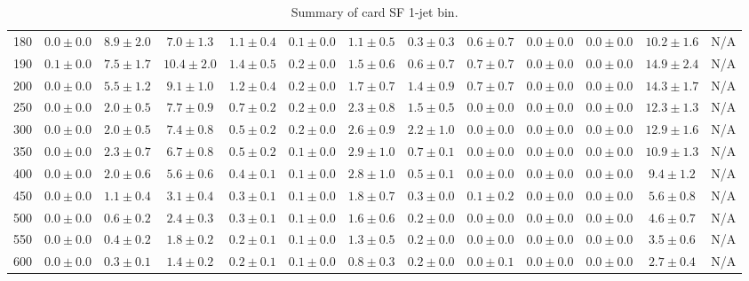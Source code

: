 \begin{table}
{\begin{center}
\begin{tabular}{l | c c | c c c c c c c c  | c c}
180 & $0.0\pm0.0$ & $8.9\pm2.0$ & $7.0\pm1.3$ & $1.1\pm0.4$ & $0.1\pm0.0$ & $1.1\pm0.5$ & $0.3\pm0.3$ & $0.6\pm0.7$ & $0.0\pm0.0$ & $0.0\pm0.0$ & $10.2\pm1.6$ & N/A \\ 
190 & $0.1\pm0.0$ & $7.5\pm1.7$ & $10.4\pm2.0$ & $1.4\pm0.5$ & $0.2\pm0.0$ & $1.5\pm0.6$ & $0.6\pm0.7$ & $0.7\pm0.7$ & $0.0\pm0.0$ & $0.0\pm0.0$ & $14.9\pm2.4$ & N/A \\
200 & $0.0\pm0.0$ & $5.5\pm1.2$ & $9.1\pm1.0$ & $1.2\pm0.4$ & $0.2\pm0.0$ & $1.7\pm0.7$ & $1.4\pm0.9$ & $0.7\pm0.7$ & $0.0\pm0.0$ & $0.0\pm0.0$ & $14.3\pm1.7$ & N/A \\ 
250 & $0.0\pm0.0$ & $2.0\pm0.5$ & $7.7\pm0.9$ & $0.7\pm0.2$ & $0.2\pm0.0$ & $2.3\pm0.8$ & $1.5\pm0.5$ & $0.0\pm0.0$ & $0.0\pm0.0$ & $0.0\pm0.0$ & $12.3\pm1.3$ & N/A \\ 
300 & $0.0\pm0.0$ & $2.0\pm0.5$ & $7.4\pm0.8$ & $0.5\pm0.2$ & $0.2\pm0.0$ & $2.6\pm0.9$ & $2.2\pm1.0$ & $0.0\pm0.0$ & $0.0\pm0.0$ & $0.0\pm0.0$ & $12.9\pm1.6$ & N/A \\ 
350 & $0.0\pm0.0$ & $2.3\pm0.7$ & $6.7\pm0.8$ & $0.5\pm0.2$ & $0.1\pm0.0$ & $2.9\pm1.0$ & $0.7\pm0.1$ & $0.0\pm0.0$ & $0.0\pm0.0$ & $0.0\pm0.0$ & $10.9\pm1.3$ & N/A \\ 
400 & $0.0\pm0.0$ & $2.0\pm0.6$ & $5.6\pm0.6$ & $0.4\pm0.1$ & $0.1\pm0.0$ & $2.8\pm1.0$ & $0.5\pm0.1$ & $0.0\pm0.0$ & $0.0\pm0.0$ & $0.0\pm0.0$ & $9.4\pm1.2$ & N/A \\ 
450 & $0.0\pm0.0$ & $1.1\pm0.4$ & $3.1\pm0.4$ & $0.3\pm0.1$ & $0.1\pm0.0$ & $1.8\pm0.7$ & $0.3\pm0.0$ & $0.1\pm0.2$ & $0.0\pm0.0$ & $0.0\pm0.0$ & $5.6\pm0.8$ & N/A \\ 
500 & $0.0\pm0.0$ & $0.6\pm0.2$ & $2.4\pm0.3$ & $0.3\pm0.1$ & $0.1\pm0.0$ & $1.6\pm0.6$ & $0.2\pm0.0$ & $0.0\pm0.0$ & $0.0\pm0.0$ & $0.0\pm0.0$ & $4.6\pm0.7$ & N/A \\ 
550 & $0.0\pm0.0$ & $0.4\pm0.2$ & $1.8\pm0.2$ & $0.2\pm0.1$ & $0.1\pm0.0$ & $1.3\pm0.5$ & $0.2\pm0.0$ & $0.0\pm0.0$ & $0.0\pm0.0$ & $0.0\pm0.0$ & $3.5\pm0.6$ & N/A \\ 
600 & $0.0\pm0.0$ & $0.3\pm0.1$ & $1.4\pm0.2$ & $0.2\pm0.1$ & $0.1\pm0.0$ & $0.8\pm0.3$ & $0.2\pm0.0$ & $0.0\pm0.1$ & $0.0\pm0.0$ & $0.0\pm0.0$ & $2.7\pm0.4$ & N/A \\ 
\hline
\end{tabular}
\end{center}
}
\caption{Summary of card SF 1-jet bin.}
\end{table}
